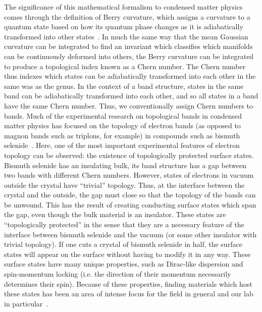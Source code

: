 \documentclass{thesis-umich}
\begin{document}
The significance of this mathematical formalism to condensed matter physics comes through the definition of Berry curvature, which assigns a curvature to a quantum state based on how its quantum phase changes as it is  adiabatically transformed into other states~\cite{Berry1984}. In much the same way that the mean Gaussian curvature can be integrated to find an invariant which classifies which manifolds can be continuously deformed into others, the Berry curvature can be integrated to produce a topological index known as a Chern number. The Chern number thus indexes which states can be adiabatically transformed into each other in the same was as the genus. In the context of a band structure, states in the same band can be adiabatically transformed into each other, and so all states in a band have the same Chern number. Thus, we conventionally assign Chern numbers to bands. Much of the experimental research on topological bands in condensed matter physics has focused on the topology of electron bands (as opposed to magnon bands such as triplons, for example) in compounds such as bismuth selenide~\cite{Hsieh2008}. Here, one of the most important experimental features of electron topology can be observed: the existence of topologically protected surface states. Bismuth selenide has an insulating bulk, its band structure has a gap between two bands with different Chern numbers. However, states of electrons in vacuum outside the crystal have ``trivial'' topology. Thus, at the interface between the crystal and the outside, the gap must close so that the topology of the bands can be unwound. This has the result of creating conducting surface states which span the gap, even though the bulk material is an insulator. These states are ``topologically protected'' in the sense that they are a necessary feature of the interface between bismuth selenide and the vacuum (or some other insulator with trivial topology). If one cuts a crystal of bismuth selenide in half, the surface states will appear on the surface without having to modify it in any way. These surface states have many unique properties, such as Dirac-like dispersion and spin-momentum locking (i.e. the direction of their momentum necessarily determines their spin)\cite{Fu2007}. Because of these properties, finding materials which host these states has been an area of intense focus for the field in general and our lab in particular~\cite{Li2014}.
\end{document}
